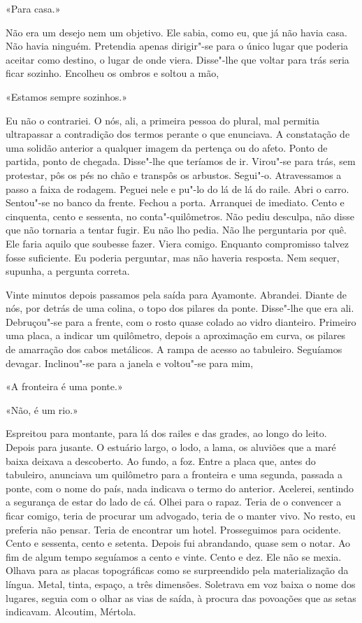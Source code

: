 «Para casa.»

Não era um desejo nem um objetivo. Ele sabia, como eu, que já não havia
casa. Não havia ninguém. Pretendia apenas dirigir"-se para o único lugar
que poderia aceitar como destino, o lugar de onde viera. Disse"-lhe que
voltar para trás seria ficar sozinho. Encolheu os ombros e soltou a mão,

«Estamos sempre sozinhos.»

Eu não o contrariei. O nós, ali, a primeira pessoa do plural, mal
permitia ultrapassar a contradição dos termos perante o que enunciava. A
constatação de uma solidão anterior a qualquer imagem da pertença ou do
afeto. Ponto de partida, ponto de chegada. Disse"-lhe que teríamos de
ir. Virou"-se para trás, sem protestar, pôs os pés no chão e transpôs os
arbustos. Segui"-o. Atravessamos a passo a faixa de rodagem. Peguei nele
e pu"-lo do lá de lá do raile. Abri o carro. Sentou"-se no banco da
frente. Fechou a porta. Arranquei de imediato. Cento e cinquenta, cento
e sessenta, no conta"-quilômetros. Não pediu desculpa, não disse que não
tornaria a tentar fugir. Eu não lho pedia. Não lhe perguntaria por quê.
Ele faria aquilo que soubesse fazer. Viera comigo. Enquanto compromisso
talvez fosse suficiente. Eu poderia perguntar, mas não haveria resposta.
Nem sequer, supunha, a pergunta correta.

Vinte minutos depois passamos pela saída para Ayamonte. Abrandei. Diante
de nós, por detrás de uma colina, o topo dos pilares da ponte.
Disse"-lhe que era ali. Debruçou"-se para a frente, com o rosto quase
colado ao vidro dianteiro. Primeiro uma placa, a indicar um quilômetro,
depois a aproximação em curva, os pilares de amarração dos cabos
metálicos. A rampa de acesso ao tabuleiro. Seguíamos devagar.
Inclinou"-se para a janela e voltou"-se para mim,

«A fronteira é uma ponte.»

«Não, é um rio.»

Espreitou para montante, para lá dos railes e das grades, ao longo do
leito. Depois para jusante. O estuário largo, o lodo, a lama, os
aluviões que a maré baixa deixava a descoberto. Ao fundo, a foz. Entre a
placa que, antes do tabuleiro, anunciava um quilômetro para a fronteira
e uma segunda, passada a ponte, com o nome do país, nada indicava o
termo do anterior. Acelerei, sentindo a segurança de estar do lado de
cá. Olhei para o rapaz. Teria de o convencer a ficar comigo, teria de
procurar um advogado, teria de o manter vivo. No resto, eu preferia não
pensar. Teria de encontrar um hotel. Prosseguimos para ocidente. Cento e
sessenta, cento e setenta. Depois fui abrandando, quase sem o notar. Ao
fim de algum tempo seguíamos a cento e vinte. Cento e dez. Ele não se
mexia. Olhava para as placas topográficas como se surpreendido pela
materialização da língua. Metal, tinta, espaço, a três dimensões.
Soletrava em voz baixa o nome dos lugares, seguia com o olhar as vias de
saída, à procura das povoações que as setas indicavam. Alcoutim,
Mértola.

